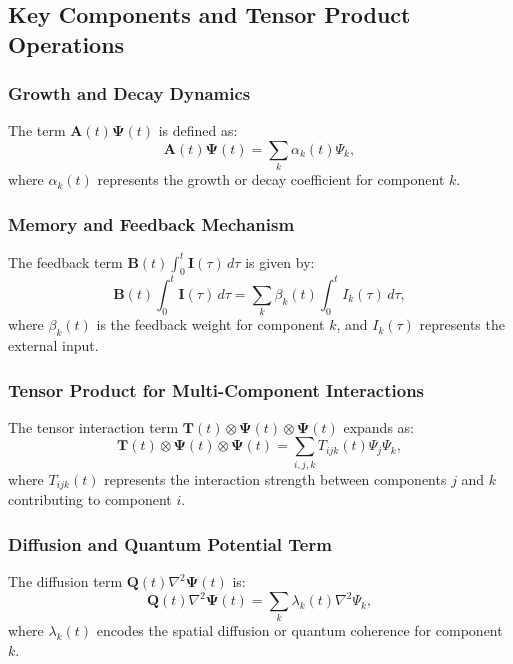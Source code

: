 \documentclass{article}
\theoremstyle{plain}
\begin{document}
\subsection{Key Components and Tensor Product Operations}
\subsubsection{Growth and Decay Dynamics}
The term \(\bm{A}(t) \bm{\Psi}(t)\) is defined as:
\begin{equation}
\bm{A}(t) \bm{\Psi}(t) = \sum_k \alpha_k(t) \Psi_k,
\end{equation}
where \(\alpha_k(t)\) represents the growth or decay coefficient for component \(k\).

\subsubsection{Memory and Feedback Mechanism}
The feedback term \(\bm{B}(t) \int_0^t \bm{I}(\tau) \, d\tau\) is given by:
\begin{equation}
\bm{B}(t) \int_0^t \bm{I}(\tau) \, d\tau = \sum_k \beta_k(t) \int_0^t I_k(\tau) \, d\tau,
\end{equation}
where \(\beta_k(t)\) is the feedback weight for component \(k\), and \(I_k(\tau)\) represents the external input.

\subsubsection{Tensor Product for Multi-Component Interactions}
The tensor interaction term \(\bm{T}(t) \otimes \bm{\Psi}(t) \otimes \bm{\Psi}(t)\) expands as:
\begin{equation}
\bm{T}(t) \otimes \bm{\Psi}(t) \otimes \bm{\Psi}(t) = \sum_{i,j,k} T_{ijk}(t) \Psi_j \Psi_k,
\end{equation}
where \(T_{ijk}(t)\) represents the interaction strength between components \(j\) and \(k\) contributing to component \(i\).

\subsubsection{Diffusion and Quantum Potential Term}
The diffusion term \(\bm{Q}(t) \nabla^2 \bm{\Psi}(t)\) is:
\begin{equation}
\bm{Q}(t) \nabla^2 \bm{\Psi}(t) = \sum_k \lambda_k(t) \nabla^2 \Psi_k,
\end{equation}
where \(\lambda_k(t)\) encodes the spatial diffusion or quantum coherence for component \(k\).
\end{document}
